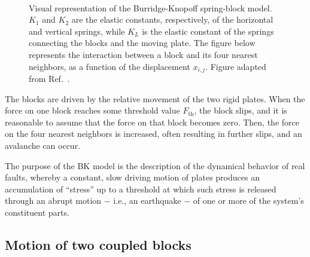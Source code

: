 \begin{figure}[!htbp]
    \centering
    \\[0.43cm]
    \caption{Visual representation of the Burridge-Knopoff spring-block model. $K_1$ and $K_2$
    are the elastic constants, respectively, of the horizontal and vertical springs, while $K_L$
    is the elastic constant of the springs connecting the blocks and the moving plate.
    The figure below represents the interaction between a block and its four nearest neighbors,
    as a function of the displacement $x_{i,j}$. Figure adapted from Ref.~\cite{ref:ofc}.
    }\label{fig bk}
\end{figure}

The blocks are driven by the relative movement of the two rigid plates. When the force on one block
reaches some threshold value $F_{\text{th}}$, the block slips, and it is reasonable to assume that the
force on that block becomes zero. Then, the force on the four nearest neighbors is increased, often
resulting in further slips, and an avalanche can occur.

The purpose of the BK model is the description of the dynamical behavior of
real faults, whereby a constant, slow driving motion of plates produces an accumulation of ``stress''
up to a threshold at which such stress is released through an abrupt motion $-$ i.e., an earthquake $-$
of one or more of the system's constituent parts.

\subsection{Motion of two coupled blocks}\label{subsec: diff eqs for two blocks}

